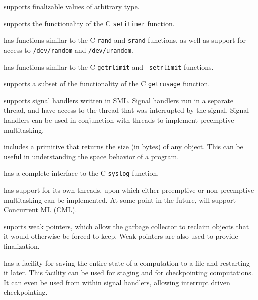 \begin{description}
\begin{description}
{\mlton} supports finalizable values of arbitrary type.

{\mlton} supports the functionality of the C {\tt setitimer} function.

{\mlton} has functions similar to the C {\tt rand} and {\tt srand} functions, as
well as support for access to {\tt /dev/random} and {\tt /dev/urandom}.

{\mlton} has functions similar to the C {\tt getrlimit} and {\tt
setrlimit} functions.

{\mlton} supports a subset of the functionality of the C {\tt getrusage}
function.

{\mlton} supports signal handlers written in SML.  Signal handlers run
in a separate {\mlton} thread, and have access to the thread that was
interrupted by the signal.  Signal handlers can be used in conjunction
with threads to implement preemptive multitasking.

{\mlton} includes a primitive that returns the size (in bytes) of any
object.  This can be useful in understanding the space behavior of a
program.

{\mlton} has a complete interface to the C {\tt syslog} function.

{\mlton} has support for its own threads, upon which either preemptive
or non-preemptive multitasking can be implemented.  At some point in
the future, {\mlton} will support Concurrent ML (CML).

{\mlton} suports weak pointers, which allow the garbage collector to
reclaim objects that it would otherwise be forced to keep.  Weak
pointers are also used to provide finalization.

{\mlton} has a facility for saving the entire state of a computation
to a file and restarting it later.  This facility can be used for
staging and for checkpointing computations.  It can even be used from
within signal handlers, allowing interrupt driven checkpointing.

\end{description}
\end{description}

